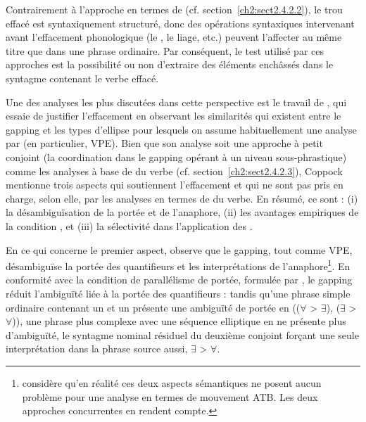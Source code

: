 Contrairement à l’approche en termes de  (cf. section~\ref{ch2:sect2.4.2.2}), le trou effacé est syntaxiquement structuré, donc des opérations syntaxiques intervenant avant l’effacement phonologique (le , le liage, etc.) peuvent l’affecter au même titre que dans une phrase ordinaire. Par conséquent, le test utilisé par ces approches est la possibilité ou non d’extraire des éléments enchâssés dans le syntagme contenant le verbe effacé.

Une des analyses les plus discutées dans cette perspective est le travail de \citet{Coppock2001}, qui essaie de justifier l’effacement en observant les similarités qui existent entre le gapping et les types d’ellipse pour lesquels on assume habituellement une analyse par  (en particulier, VPE). Bien que son analyse soit une approche à petit conjoint (la coordination dans le gapping opérant à un niveau sous-phrastique) comme les analyses à base de  du verbe (cf. section~\ref{ch2:sect2.4.2.3}), Coppock mentionne trois aspects qui soutiennent l’effacement et qui ne sont pas pris en charge, selon elle, par les analyses en termes de  du verbe. En résumé, ce sont : (i) la désambiguïsation de la portée et de l’anaphore, (ii) les avantages empiriques de la condition , et (iii) la sélectivité dans l’application des . 

En ce qui concerne le premier aspect, \citet{Coppock2001} observe que le gapping, tout comme VPE, désambiguïse la portée des quantifieurs et les interprétations de l’anaphore\footnote{
 \citet{Johnson2009} considère qu’en réalité ces deux aspects sémantiques ne posent aucun problème pour une analyse en termes de mouvement ATB. Les deux approches concurrentes en rendent compte.}. En conformité avec la condition de parallélisme de portée, formulée par \citet{Fox2000}, le gapping réduit l’ambiguïté liée à la portée des quantifieurs : tandis qu’une phrase simple ordinaire contenant un  et un  présente une ambiguïté de portée en  (($\forall$ > $\exists$), ($\exists$ > $\forall$)), une phrase plus complexe avec une séquence elliptique en  ne présente plus d’ambiguïté, le syntagme nominal résiduel du deuxième conjoint forçant une seule interprétation dans la phrase source aussi, {\cad} $\exists$ > $\forall$.   

